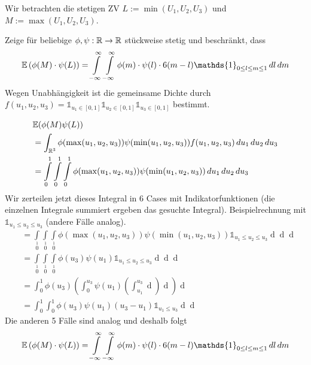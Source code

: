 Wir betrachten die stetigen ZV $L := \min(U_1, U_2, U_3)$ und $M:=\max(U_1, U_2, U_3)$.

Zeige für beliebige $\phi, \psi: \mathbb{R} \to \mathbb{R}$ stückweise stetig und beschränkt, dass 
\[\E\left(\phi(M)\cdot\psi(L)\right) = \int\limits_{-\infty}\limits^\infty \int\limits_{-\infty}\limits^\infty \phi(m) \cdot \psi(l) \cdot6(m-l)\mathds{1}_{0\leq l\leq m \leq 1}\mathop{dl}\mathop{dm}\]
Wegen Unabhängigkeit ist die gemeinsame Dichte durch $f(u_1, u_2, u_3) = \mathds{1}_{u_1 \in [0,1]}\mathds{1}_{u_2 \in [0,1]}\mathds{1}_{u_3 \in [0,1]}$ bestimmt.

\begin{align*}
	&\mathbb{E}(\phi(M)\psi(L)) \\
	&= \int_{\mathbb{R}^3} \phi(\max(u_1, u_2, u_3))\psi(\min(u_1, u_2, u_3)) f(u_1, u_2, u_3) \mathop{du_1}\mathop{du_2}\mathop{du_3}\\
	&= \int\limits_0\limits^1 \int\limits_0\limits^1 \int\limits_0\limits^1 \phi(\max(u_1, u_2, u_3))\psi(\min(u_1, u_2, u_3)) \mathop{du_1}\mathop{du_2}\mathop{du_3}
\end{align*}
Wir zerteilen jetzt dieses Integral in 6 Cases mit Indikatorfunktionen (die einzelnen Integrale summiert ergeben das gesuchte Integral). 
Beispielrechnung mit $\mathds{1}_{u_1 \leq u_2 \leq u_3}$ (andere Fälle analog).
\begin{align*}
	&= \int\limits_0\limits^1 \int\limits_0\limits^1 \int\limits_0\limits^1 \phi(\max(u_1, u_2, u_3))\psi(\min(u_1, u_2, u_3)) \mathds{1}_{u_1 \leq u_2 \leq u_3} \mathop{du_1}\mathop{du_2}\mathop{du_3}\\
	&= \int\limits_0\limits^1 \int\limits_0\limits^1 \int\limits_0\limits^1 \phi(u_3)\psi(u_1) \mathds{1}_{u_1 \leq u_2 \leq u_3} \mathop{du_1}\mathop{du_2}\mathop{du_3}\\
	&= \int_0^1 \phi(u_3) \left(\int_0^{u_3}\psi(u_1)\left(\int_{u_1}^{u_3}\mathop{du_2}\right)\mathop{du_1}\right)\mathop{du_3}\\
	&= \int_0^1\int_0^1 \phi(u_3)\psi(u_1)(u_3-u_1)\mathds{1}_{u_1\leq u_3}\mathop{du_1}\mathop{du_3}
\end{align*}
Die anderen 5 Fälle sind analog und deshalb folgt
\[\E\left(\phi(M)\cdot\psi(L)\right) = \int\limits_{-\infty}\limits^\infty \int\limits_{-\infty}\limits^\infty \phi(m) \cdot \psi(l) \cdot6(m-l)\mathds{1}_{0\leq l\leq m \leq 1}\mathop{dl}\mathop{dm}\]